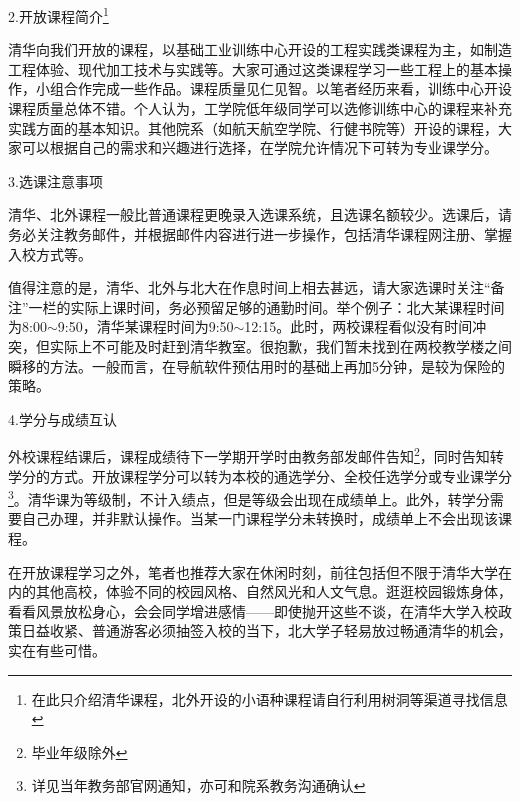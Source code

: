 \vspace{10pt}

2.开放课程简介\footnote{在此只介绍清华课程，北外开设的小语种课程请自行利用树洞等渠道寻找信息}

\vspace{10pt}

清华向我们开放的课程，以基础工业训练中心开设的工程实践类课程为主，如制造工程体验、现代加工技术与实践等。大家可通过这类课程学习一些工程上的基本操作，小组合作完成一些作品。课程质量见仁见智。以笔者经历来看，训练中心开设课程质量总体不错。个人认为，工学院低年级同学可以选修训练中心的课程来补充实践方面的基本知识。其他院系（如航天航空学院、行健书院等）开设的课程，大家可以根据自己的需求和兴趣进行选择，在学院允许情况下可转为专业课学分。

\vspace{10pt}

3.选课注意事项

\vspace{10pt}

清华、北外课程一般比普通课程更晚录入选课系统，且选课名额较少。选课后，请务必关注教务邮件，并根据邮件内容进行进一步操作，包括清华课程网注册、掌握入校方式等。

\vspace{10pt}

值得注意的是，清华、北外与北大在作息时间上相去甚远，请大家选课时关注“备注”一栏的实际上课时间，务必预留足够的通勤时间。举个例子：北大某课程时间为8:00$\sim$9:50，清华某课程时间为9:50$\sim$12:15。此时，两校课程看似没有时间冲突，但实际上不可能及时赶到清华教室。很抱歉，我们暂未找到在两校教学楼之间瞬移的方法。一般而言，在导航软件预估用时的基础上再加5分钟，是较为保险的策略。

\vspace{10pt}

4.学分与成绩互认

\vspace{10pt}

外校课程结课后，课程成绩待下一学期开学时由教务部发邮件告知\footnote{毕业年级除外}，同时告知转学分的方式。开放课程学分可以转为本校的通选学分、全校任选学分或专业课学分\footnote{详见当年教务部官网通知，亦可和院系教务沟通确认}。清华课为等级制，不计入绩点，但是等级会出现在成绩单上。此外，转学分需要自己办理，并非默认操作。当某一门课程学分未转换时，成绩单上不会出现该课程。

\vspace{10pt}

在开放课程学习之外，笔者也推荐大家在休闲时刻，前往包括但不限于清华大学在内的其他高校，体验不同的校园风格、自然风光和人文气息。逛逛校园锻炼身体，看看风景放松身心，会会同学增进感情——即使抛开这些不谈，在清华大学入校政策日益收紧、普通游客必须抽签入校的当下，北大学子轻易放过畅通清华的机会，实在有些可惜。

